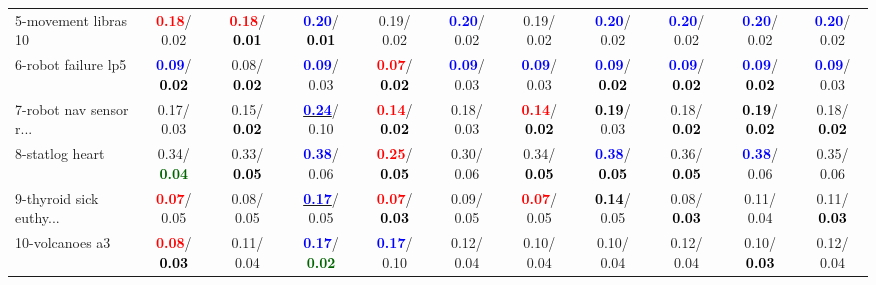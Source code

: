 \begin{table}[h]
\begin{center}
{\begin{tabular}{lc|c|c|c|c|c|c|c|c|c}
5-movement libras 10 & \textcolor{red}{\textbf{  0.18}}/  0.02 & \textcolor{red}{\textbf{  0.18}}/\textcolor{black}{\textbf{  0.01}} & \textcolor{blue}{\textbf{  0.20}}/\textcolor{black}{\textbf{  0.01}} &   0.19/  0.02 & \textcolor{blue}{\textbf{  0.20}}/  0.02 &   0.19/  0.02 & \textcolor{blue}{\textbf{  0.20}}/  0.02 & \textcolor{blue}{\textbf{  0.20}}/  0.02 & \textcolor{blue}{\textbf{  0.20}}/  0.02 & \textcolor{blue}{\textbf{  0.20}}/  0.02 \\
6-robot failure lp5 & \textcolor{blue}{\textbf{  0.09}}/\textcolor{black}{\textbf{  0.02}} &   0.08/\textcolor{black}{\textbf{  0.02}} & \textcolor{blue}{\textbf{  0.09}}/  0.03 & \textcolor{red}{\textbf{  0.07}}/\textcolor{black}{\textbf{  0.02}} & \textcolor{blue}{\textbf{  0.09}}/  0.03 & \textcolor{blue}{\textbf{  0.09}}/  0.03 & \textcolor{blue}{\textbf{  0.09}}/\textcolor{black}{\textbf{  0.02}} & \textcolor{blue}{\textbf{  0.09}}/\textcolor{black}{\textbf{  0.02}} & \textcolor{blue}{\textbf{  0.09}}/\textcolor{black}{\textbf{  0.02}} & \textcolor{blue}{\textbf{  0.09}}/  0.03 \\
7-robot nav sensor r... &   0.17/  0.03 &   0.15/\textcolor{black}{\textbf{  0.02}} & \underline{\textcolor{blue}{\textbf{  0.24}}}/  0.10 & \textcolor{red}{\textbf{  0.14}}/\textcolor{black}{\textbf{  0.02}} &   0.18/  0.03 & \textcolor{red}{\textbf{  0.14}}/\textcolor{black}{\textbf{  0.02}} & \textcolor{black}{\textbf{  0.19}}/  0.03 &   0.18/\textcolor{black}{\textbf{  0.02}} & \textcolor{black}{\textbf{  0.19}}/\textcolor{black}{\textbf{  0.02}} &   0.18/\textcolor{black}{\textbf{  0.02}} \\ \hline
8-statlog heart &   0.34/\textcolor{darkgreen}{\textbf{  0.04}} &   0.33/\textcolor{black}{\textbf{  0.05}} & \textcolor{blue}{\textbf{  0.38}}/  0.06 & \textcolor{red}{\textbf{  0.25}}/\textcolor{black}{\textbf{  0.05}} &   0.30/  0.06 &   0.34/\textcolor{black}{\textbf{  0.05}} & \textcolor{blue}{\textbf{  0.38}}/\textcolor{black}{\textbf{  0.05}} &   0.36/\textcolor{black}{\textbf{  0.05}} & \textcolor{blue}{\textbf{  0.38}}/  0.06 &   0.35/  0.06 \\
9-thyroid sick euthy... & \textcolor{red}{\textbf{  0.07}}/  0.05 &   0.08/  0.05 & \underline{\textcolor{blue}{\textbf{  0.17}}}/  0.05 & \textcolor{red}{\textbf{  0.07}}/\textcolor{black}{\textbf{  0.03}} &   0.09/  0.05 & \textcolor{red}{\textbf{  0.07}}/  0.05 & \textcolor{black}{\textbf{  0.14}}/  0.05 &   0.08/\textcolor{black}{\textbf{  0.03}} &   0.11/  0.04 &   0.11/\textcolor{black}{\textbf{  0.03}} \\
10-volcanoes a3 & \textcolor{red}{\textbf{  0.08}}/\textcolor{black}{\textbf{  0.03}} &   0.11/  0.04 & \textcolor{blue}{\textbf{  0.17}}/\textcolor{darkgreen}{\textbf{  0.02}} & \textcolor{blue}{\textbf{  0.17}}/  0.10 &   0.12/  0.04 &   0.10/  0.04 &   0.10/  0.04 &   0.12/  0.04 &   0.10/\textcolor{black}{\textbf{  0.03}} &   0.12/  0.04 \\\end{tabular}}\label{stratsALCKappa0aCIELMBatchRedux}
\end{center}
\end{table}